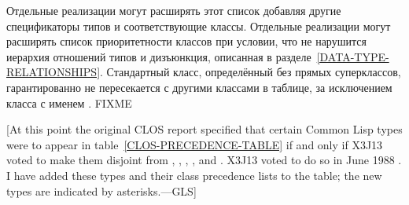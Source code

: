Отдельные реализации могут расширять этот список добавляя другие спецификаторы
типов и соответствующие классы.
Отдельные реализации могут расширять список приоритетности классов при условии,
что не нарушится иерархия отношений типов и дизъюнкция, описанная в
разделе~\ref{DATA-TYPE-RELATIONSHIPS}.
Стандартный класс, определённый без прямых суперклассов, гарантированно не
пересекается с другими классами в таблице, за исключением класса с именем
. FIXME

[At this point the original CLOS report specified that certain Common Lisp
types were to appear in table~\ref{CLOS-PRECEDENCE-TABLE} if and only if
X3J13 voted to make them disjoint from
, , , , and .
X3J13 voted to do so in June 1988
.  I have added these types
and their class precedence lists to the table; the new types are indicated
by asterisks.---GLS]

